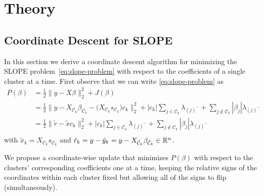 
\section{Theory}\label{sec:theory}
\subsection{Coordinate Descent for SLOPE}%
\label{sec:coordinate-updates}

In this section we derive a coordinate descent algorithm for minimizing the SLOPE problem~\eqref{eq:slope-problem} with respect to the coefficients of a single cluster at a time.
First observe that we can write \eqref{eq:slope-problem} as
\[
  \begin{aligned}
    P(\beta)
     & =  \frac{1}{2} \lVert y - X\beta\rVert_2^2 + J(\beta)                        \\
     & = \frac{1}{2} \lVert y - X_{\bar{\mathcal{C}_k}} \beta_{\bar{\mathcal{C}_k}}
    - \big(X_{\mathcal{C}_k} s_{\mathcal{C}_k}\big)c_k  \rVert_2^2
    + |c_k|\sum_{j \in {\mathcal{C}_k}} \lambda_{(j)^-}
    + \sum_{j \notin {\mathcal{C}_k}} |\beta_j|\lambda_{(j)^-}                      \\
     & = \frac{1}{2} \lVert \tilde r - \tilde x c_k \rVert_2^2
    + |c_k|\sum_{j \in {\mathcal{C}_k}} \lambda_{(j)^-}
    + \sum_{j \notin {\mathcal{C}_k}} |\beta_j|\lambda_{(j)^-}                      \\
  \end{aligned}
\]
with \( \tilde x_k = X_{\mathcal{C}_k} s_{\mathcal{C}_k}\) and
\(\tilde r_k = y - \tilde y_k = y - X_{\bar{\mathcal{C}}_k} \beta_{\bar{\mathcal{C}}_k} \in \mathbb{R}^n\).

We propose a coordinate-wise update that minimizes \(P(\beta)\) with respect to the
clusters' corresponding coefficients one at a time, keeping the relative signs
of the coordinates within each cluster fixed but allowing all of the signs to
flip (simultaneously).

